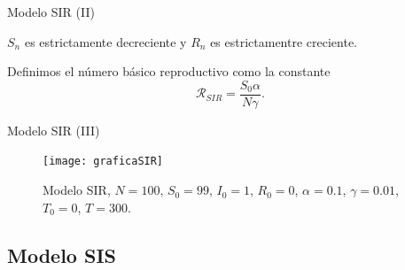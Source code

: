 \begin{frame}{Modelo SIR (II)}

        \begin{lema}
            $S_n$ es estrictamente decreciente y $R_n$ es estrictamentre creciente.
        \end{lema}

        \pause

        \begin{definicion}
            Definimos el número básico reproductivo como la constante 
            $$\mathcal{R}_{SIR}=\frac{S_0 \alpha}{N\gamma }.$$
        \end{definicion}

\end{frame}


\begin{frame}{Modelo SIR (III)}
    \begin{figure}
        \begin{center}
        \caption{Modelo SIR, $N=100$, $S_0=99$, $I_0 = 1$, $R_0 = 0$, $\alpha = 0.1$, $\gamma = 0.01$, $T_0 = 0$, $T = 300$.}
        \texttt{[image: graficaSIR]}
        \end{center}
    \end{figure}
\end{frame}


\subsection{Modelo SIS}


